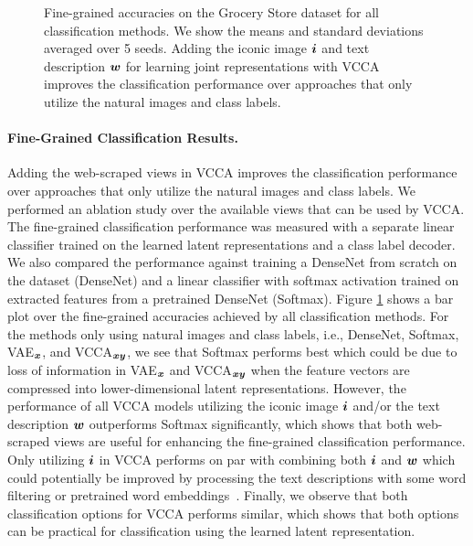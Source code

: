 \begin{figure}[t]
	\centering
	\setlength{\figwidth}{0.62\textwidth}
	\setlength{\figheight}{.22\textheight}
	
	\vspace{-2mm}
	\caption{Fine-grained accuracies on the Grocery Store dataset for all classification methods. We show the means and standard deviations averaged over 5 seeds. Adding the iconic image ${\bm{i}}$ and text description ${\bm{w}}$ for learning joint representations with VCCA improves the classification performance over approaches that only utilize the natural images and class labels.}
	\label{fig:fine_grained_classification_results}
	\vspace{-3mm}
\end{figure}

\vspace{-3mm}
\paragraph{Fine-Grained Classification Results.} Adding the web-scraped views in VCCA improves the classification performance over approaches that only utilize the natural images and class labels. We performed an ablation study over the available views that can be used by VCCA. The fine-grained classification performance was measured with a separate linear classifier trained on the learned latent representations and a class label decoder. We also compared the performance against training a DenseNet from scratch on the dataset (DenseNet) and a linear classifier with softmax activation trained on extracted features from a pretrained DenseNet (Softmax). 
Figure \ref{fig:fine_grained_classification_results} shows a bar plot over the fine-grained accuracies achieved by all classification methods.
For the methods only using natural images and class labels, i.e., DenseNet, Softmax, VAE$_{{\bm{x}}}$, and VCCA$_{{\bm{x}} {\bm{y}}}$, we see that Softmax performs best which could be due to loss of information in VAE$_{{\bm{x}}}$ and VCCA$_{{\bm{x}} {\bm{y}}}$ when the feature vectors are compressed into lower-dimensional latent representations.
However, the performance of all VCCA models utilizing the iconic image ${\bm{i}}$ and/or the text description ${\bm{w}}$ outperforms Softmax significantly, which shows that both web-scraped views are useful for enhancing the fine-grained classification performance.
Only utilizing ${\bm{i}}$ in VCCA performs on par with combining both ${\bm{i}}$ and ${\bm{w}}$ which could potentially be improved by processing the text descriptions with some word filtering or pretrained word embeddings~\cite{mikolov2013distributed, devlin2018bert}. 
Finally, we observe that both classification options for VCCA performs similar, which shows that both options can be practical for classification using the learned latent representation. 


